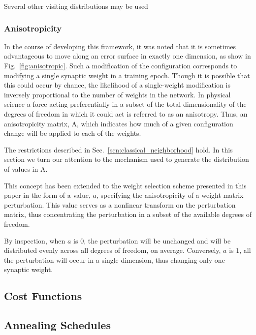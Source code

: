 \documentclass[10pt,journal,cspaper,compsoc]{IEEEtran}
\begin{document}
Several other visiting distributions may be used




\subsubsection{Anisotropicity}
\label{scn:anisotropicity}
In the course of developing this framework, it was noted that it is sometimes advantageous to move along an error surface in exactly one dimension, as show in Fig.~\ref{fig:anisotropic}. Such a modification of the configuration corresponds to modifying a single synaptic weight in a training epoch. Though it is possible that this could occur by chance, the likelihood of a single-weight modification is inversely proportional to the number of weights in the network. In physical science a force acting preferentially in a subset of the total dimensionality of the degrees of freedom in which it could act is referred to as an anisotropy. Thus, an anisotropicity matrix, A, which indicates how much of a given configuration change will be applied to each of the weights. 

The restrictions described in Sec.~\ref{scn:classical_neighborhood} hold. In this section we turn our attention to the mechanism used to generate the distribution of values in A. 



This concept has been extended to the weight selection scheme presented in this paper in the form of a value, $a$, specifying the anisotropicity of a weight matrix perturbation. This value serves as a nonlinear transform on the perturbation matrix, thus concentrating the perturbation in a subset of the available degrees of freedom.

By inspection, when $a$ is $0$, the perturbation will be unchanged and will be distributed evenly across all degrees of freedom, on average. Conversely, $a$ is $1$, all the perturbation will occur in a single dimension, thus changing only one synaptic weight.

\subsection{Cost Functions}
\label{scn:cost_functions}


\subsection{Annealing Schedules}
\label{scn:annealing_schedules}
\end{document}
